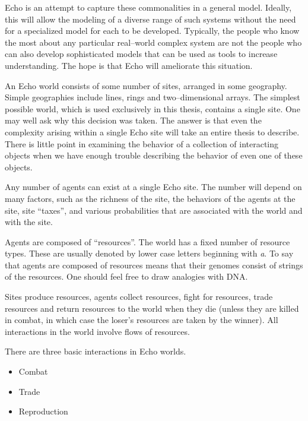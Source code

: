Echo is an attempt to capture these commonalities in a general model.
Ideally, this will allow the modeling of a diverse range of such
systems without the need for a specialized model for each to be
developed. Typically, the people who know the most about any
particular real--world complex system are not the people who can also
develop sophisticated models that can be used as tools to increase
understanding. The hope is that Echo will ameliorate this situation.

An Echo world consists of some number of sites, arranged in some
geography. Simple geographies include lines, rings and
two--dimensional arrays. The simplest possible world, which is used
exclusively in this thesis, contains a single site. One may well ask
why this decision was taken. The answer is that even the complexity
arising within a single Echo site will take an entire thesis to
describe. There is little point in examining the behavior of a
collection of interacting objects when we have enough trouble
describing the behavior of even one of these objects.

Any number of agents can exist at a single Echo site. The number will
depend on many factors, such as the richness of the site, the behaviors
of the agents at the site, site ``taxes'', and various probabilities
that are associated with the world and with the site.

Agents are composed of ``resources''. The world has a fixed number of
resource types. These are usually denoted by lower case letters
beginning with {\em a}. To say that agents are composed of resources
means that their genomes consist of strings of the resources. One
should feel free to draw analogies with DNA.

Sites produce resources, agents collect resources, fight for
resources, trade resources and return resources to the world when they
die (unless they are killed in combat, in which case the loser's
resources are taken by the winner). All interactions in the world
involve flows of resources.

There are three basic interactions in Echo worlds.

\begin{itemize}

\item Combat

\item Trade

\item Reproduction

\end{itemize}

